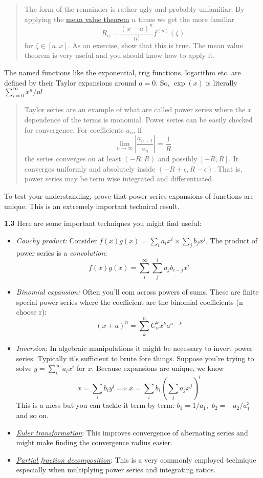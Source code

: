 \documentclass[11pt]{article}
\begin{document}
\begin{quote}
The form of the remainder is rather ugly and probably unfamiliar. By
applying the
\href{https://en.wikipedia.org/wiki/Mean_value_theorem}{mean value
theorem} \(n\) times we get the more familiar \[
R_n = \frac{(x-a)^n}{n!} f^{(n)}(\zeta)
\] for \(\zeta\in[a, x]\). As an exercise, show that this is true. The
mean value theorem is very useful and you should know how to apply it.
\end{quote}

The named functions like the exponential, trig functions, logarithm etc.
are defined by their Taylor expansions around \(a=0\). So, \(\exp(x)\)
is literally \(\sum_{i=0}^\infty x^n/n!\)

\begin{quote}
Taylor series are an example of what are called power series where the
\(x\) dependence of the terms is monomial. Power series can be easily
checked for convergence. For coefficients \(a_n\), if \[
\lim_{n\to \infty}\left|\frac{a_{n+1}}{a_n} \right| = \frac{1}{R}
\] the series converges on at least \((-R, R)\) and possibly
\([-R, R]\). It converges uniformly and absolutely inside
\((-R+\epsilon, R-\epsilon)\). That is, power series may be term wise
integrated and differentiated.
\end{quote}

To test your understanding, prove that power series expansions of
functions are unique. This is an extremely important technical result.

\textbf{1.3} Here are some important techniques you might find useful:

\begin{itemize}
\item
  \emph{Cauchy product:} Consider
  \(f(x)g(x)=\sum_i a_i x^i\times \sum_jb_j x^j\). The product of power
  series is a \emph{convolution}: \[
   f(x)g(x)= \sum_{i}^\infty\sum_j^i a_j b_{i-j}x^i
  \]
\item
  \emph{Binomial expansion:} Often you'll com across powers of sums.
  These are finite special power series where the coefficient are the
  binomial coefficients (n choose r): \[
  (x+a)^n = \sum_k^n C_{n}^k x^k a^{n-k}
  \]
\item
  \emph{Inversion}: In algebraic manipulations it might be necessary to
  invert power series. Typically it's sufficient to brute fore things.
  Suppose you're trying to solve \(y = \sum_i^\infty a_i x^i\) for
  \(x\). Because expansions are unique, we know \[
  x=\sum_i b_i y^i\implies x = \sum_{i}b_i \left(\sum_j a_j x^j\right)^i
  \] This is a mess but you can tackle it term by term: \(b_1=1/a_1,\)
  \(b_2=-a_2/a_1^3\) and so on.
\item
  \emph{\href{https://mathworld.wolfram.com/EulersSeriesTransformation.html}{Euler
  transformation}}: This improves convergence of alternating series and
  might make finding the convergence radius easier.
\item
  \emph{\href{https://en.wikipedia.org/wiki/Partial_fraction_decomposition}{Partial
  fraction decomposition}}: This is a very commonly employed technique
  especially when multiplying power series and integrating ratios.
\end{itemize}
\end{document}
